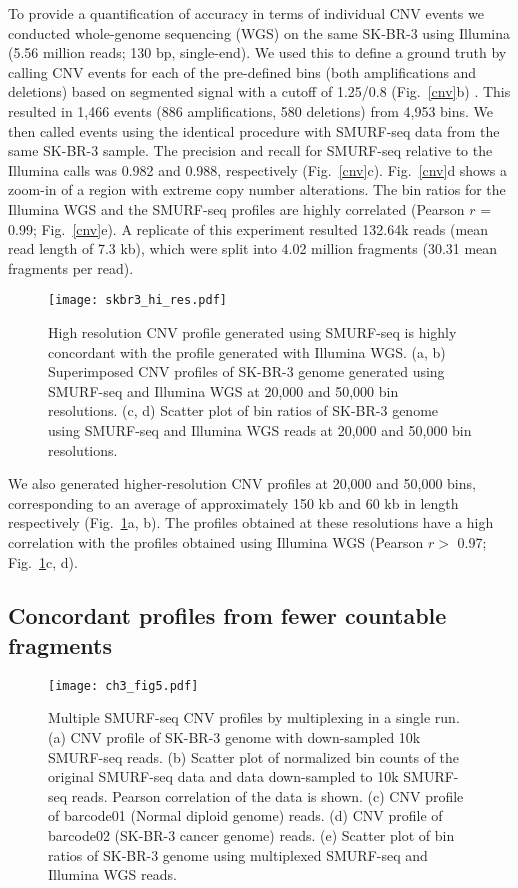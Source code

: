To provide a quantification of accuracy in terms of individual CNV
events we conducted whole-genome sequencing (WGS) on the same SK-BR-3
using Illumina (5.56 million reads; 130 bp, single-end).  We used this
to define a ground truth by calling CNV events for each of the
pre-defined bins (both amplifications and deletions) based on segmented
signal with a cutoff of 1.25/0.8 (Fig.~\ref{cnv}b)
\citep{dago2014rapid,berry2017potential}. This resulted in 1,466 events
(886 amplifications, 580 deletions) from 4,953 bins. We then called
events using the identical procedure with SMURF-seq data from the same
SK-BR-3 sample. The precision and recall for SMURF-seq relative to the
Illumina calls was 0.982 and 0.988, respectively (Fig.~\ref{cnv}c).
Fig.~\ref{cnv}d shows a zoom-in of a region with extreme copy number
alterations. The bin ratios for the Illumina WGS and the SMURF-seq
profiles are highly correlated (Pearson $r$ = 0.99; Fig.~\ref{cnv}e).
A replicate of this experiment resulted 132.64k reads (mean read length
of 7.3 kb), which were split into 4.02 million fragments (30.31 mean
fragments per read).

\begin{figure}[t!]
\centering
\texttt{[image: skbr3\_hi\_res.pdf]}
\caption[High resolution CNV profile with SMURF-seq]{
  High resolution CNV profile generated using SMURF-seq is highly concordant
  with the profile generated with Illumina WGS.
  (a, b) Superimposed CNV profiles of SK-BR-3 genome generated using SMURF-seq
  and Illumina WGS at 20,000 and 50,000 bin resolutions.
  (c, d) Scatter plot of bin ratios of SK-BR-3 genome using
  SMURF-seq and Illumina WGS reads at 20,000 and 50,000 bin resolutions. }
  \label{skbr3_hi_res}
\end{figure}

We also generated higher-resolution CNV profiles at 20,000 and 50,000
bins, corresponding to an average of approximately 150 kb and 60 kb in
length respectively (Fig.~\ref{skbr3_hi_res}a, b). The profiles obtained
at these resolutions have a high correlation with the profiles obtained
using Illumina WGS (Pearson $r>$ 0.97; Fig.~\ref{skbr3_hi_res}c, d).



\subsection{Concordant profiles from fewer countable fragments}
\begin{figure}[t!]
\centering
\texttt{[image: ch3\_fig5.pdf]}
\caption[Multiple SMURF-seq CNV profiles by multiplexing in a single run]{
  Multiple SMURF-seq CNV profiles by multiplexing in a single run.
  (a) CNV profile of SK-BR-3 genome with down-sampled 10k SMURF-seq reads.
  (b) Scatter plot of normalized bin counts of the original SMURF-seq
  data and data down-sampled to 10k SMURF-seq reads. Pearson
  correlation of the data is shown.
  (c) CNV profile of barcode01 (Normal diploid genome) reads.
  (d) CNV profile of barcode02 (SK-BR-3 cancer genome) reads.
  (e) Scatter plot of bin ratios of SK-BR-3 genome using
  multiplexed SMURF-seq and Illumina WGS reads.}
\label{cnv_mux}
\end{figure}

